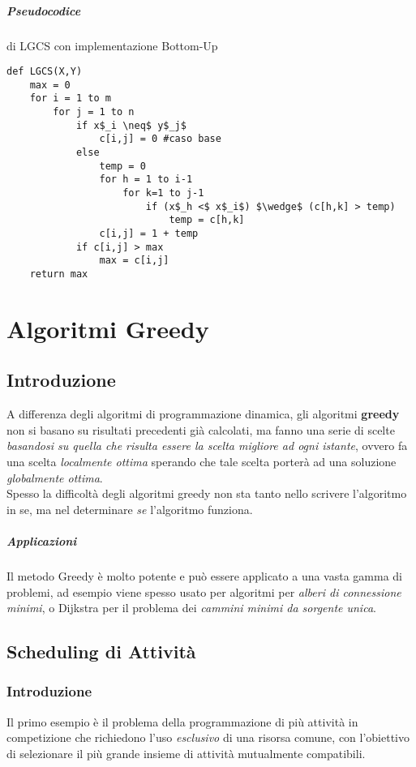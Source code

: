 \documentclass[12pt, a4paper, openany]{book}
\begin{document}
\paragraph*{Pseudocodice} di LGCS con implementazione Bottom-Up

\begin{lstlisting}
def LGCS(X,Y)
	max = 0
	for i = 1 to m
		for j = 1 to n
			if x$_i \neq$ y$_j$
				c[i,j] = 0 #caso base
			else
				temp = 0
				for h = 1 to i-1
					for k=1 to j-1
						if (x$_h <$ x$_i$) $\wedge$ (c[h,k] > temp)
							temp = c[h,k]
				c[i,j] = 1 + temp
			if c[i,j] > max
				max = c[i,j]
	return max
\end{lstlisting}

\chapter{Algoritmi Greedy}
\section{Introduzione}
A differenza degli algoritmi di programmazione dinamica, gli algoritmi \textbf{greedy} non si basano su risultati precedenti già calcolati, ma fanno una serie di scelte \emph{basandosi su quella che risulta essere la scelta migliore ad ogni istante}, ovvero fa una scelta \emph{localmente ottima} sperando che tale scelta porterà ad una soluzione \emph{globalmente ottima}.
\\Spesso la difficoltà degli algoritmi greedy non sta tanto nello scrivere l'algoritmo in se, ma nel determinare \emph{se} l'algoritmo funziona. 
\paragraph{Applicazioni}
Il metodo Greedy è molto potente e può essere applicato a una vasta gamma di problemi, ad esempio viene spesso usato per algoritmi per \emph{alberi di connessione minimi}, o Dijkstra per il problema dei \emph{cammini minimi da sorgente unica}.
\section{Scheduling di Attività}

\subsection*{Introduzione}
Il primo esempio è il problema della programmazione di più attività in competizione che richiedono l'uso \emph{esclusivo} di una risorsa comune, con l'obiettivo di selezionare il più grande insieme di attività mutualmente compatibili.
\end{document}
